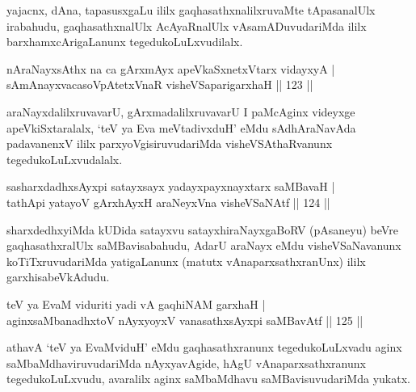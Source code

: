 \begin{artha}
yajacnx, dAna, tapasusxgaLu ililx gaqhasathxnalilxruvaMte tApasanalUlx
irabahudu, gaqhasathxnalUlx AcAyaRnalUlx vAsamADuvudariMda ililx
barxhamxcArigaLanunx tegedukoLuLxvudilalx.
\end{artha}

\begin{shl}
nAraNayxsAthx na ca gArxmAyx apeVkaSxnetxV\s tarx vidayxyA | \\
sAmAnayxvacasoVpAtetxVnaR visheVSaparigarxhaH \hfill|| 123 || 
\end{shl}

\begin{artha}
araNayxdalilxruvavarU, gArxmadalilxruvavarU I paMcAginx videyxge
apeVkiSxtaralalx, `teV ya Eva meVtadivxduH' eMdu sAdhAraNavAda
padavanenxV ililx parxyoVgisiruvu\-dariMda visheVSAthaRvanunx
tegedukoLuLxvudalalx.
\end{artha}


\begin{shl}
sasharxdadhxsAyxpi satayxsayx yadayxpayxnayxtarx saMBavaH | \\
tathA\s pi yatayoV gArxhAyxH araNeyxVna visheVSaNAtf \hfill|| 124 || 
\end{shl}

\begin{artha}
sharxdedhxyiMda kUDida satayxvu satayxhiraNayxgaBoRV (pAsaneyu) beVre
gaqhasathx\-ralUlx saMBavisabahudu, AdarU araNayx eMdu visheVSaNavanunx
koTiTxruvudariMda yatigaLanunx (matutx vAnaparxsathxranUnx) ililx
garxhisabeVkAdudu.
\end{artha}


\begin{shl}
teV ya EvaM viduriti yadi vA gaqhiNAM garxhaH | \\
aginxsaMbanadhxtoV nAyxyoyxV vanasathxsAyxpi saMBavAtf \hfill|| 125 || 
\end{shl}

\begin{artha}
athavA `teV ya EvaMviduH' eMdu gaqhasathxranunx tegedukoLuLxvadu aginx
saMbaMdhaviruvudariMda nAyxyavAgide, hAgU vAnaparxsathxranunx
tegedukoLuLxvudu, avaralilx aginx saMbaMdhavu saMBavisuvudariMda
yukatx.
\end{artha}

